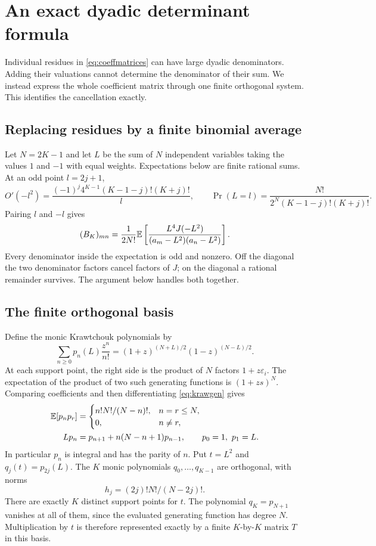 \section{An exact dyadic determinant formula}\label{sec:valuation}
Individual residues in \eqref{eq:coeffmatrices} can have large dyadic
denominators. Adding their valuations cannot determine the denominator
of their sum. We instead express the whole coefficient matrix through
one finite orthogonal system. This identifies the cancellation exactly.

\subsection{Replacing residues by a finite binomial average}
Let $N=2K-1$ and let $L$ be the sum of $N$ independent variables taking
the values $1$ and $-1$ with equal weights. Expectations below are finite
rational sums. At an odd point $l=2j+1$,
\[
 O'(-l^2)=\frac{(-1)^j4^{K-1}(K-1-j)!(K+j)!}{l},\qquad
 \Pr(L=l)=\frac{N!}{2^N(K-1-j)!(K+j)!}.
\]
Pairing $l$ and $-l$ gives
\begin{equation}\label{eq:binomial}
 (B_K)_{mn}=\frac1{2N!}\mathbb E\left[
 \frac{L^4J(-L^2)}{(a_m-L^2)(a_n-L^2)}\right].
\end{equation}
Every denominator inside the expectation is odd and nonzero. Off the
diagonal the two denominator factors cancel factors of $J$; on the
diagonal a rational remainder survives. The argument below handles
both together.

\subsection{The finite orthogonal basis}
Define the monic Krawtchouk polynomials by
\begin{equation}\label{eq:krawgen}
 \sum_{n\geq0}p_n(L)\frac{z^n}{n!}
 =(1+z)^{(N+L)/2}(1-z)^{(N-L)/2}.
\end{equation}
At each support point, the right side is the product of $N$ factors
$1+z\varepsilon_i$. The expectation of the product of two such
generating functions is $(1+zs)^N$. Comparing coefficients and then
differentiating \eqref{eq:krawgen} gives
\begin{align}
 \mathbb E[p_np_r]&=\begin{cases}n!N!/(N-n)!,&n=r\leq N,\\0,&n\ne r,
 \end{cases}\label{eq:krawnorm}\\
 Lp_n&=p_{n+1}+n(N-n+1)p_{n-1},\qquad p_0=1,\ p_1=L.
 \label{eq:krawrec}
\end{align}
In particular $p_n$ is integral and has the parity of $n$.
Put $t=L^2$ and $q_j(t)=p_{2j}(L)$. The $K$ monic polynomials
$q_0,\ldots,q_{K-1}$ are orthogonal, with norms
\begin{equation}\label{eq:h}
 h_j=(2j)!N!/(N-2j)!.
\end{equation}
There are exactly $K$ distinct support points for $t$. The polynomial
$q_K=p_{N+1}$ vanishes at all of them, since the evaluated generating
function has degree $N$. Multiplication by $t$ is therefore represented
exactly by a finite $K$-by-$K$ matrix $T$ in this basis.

